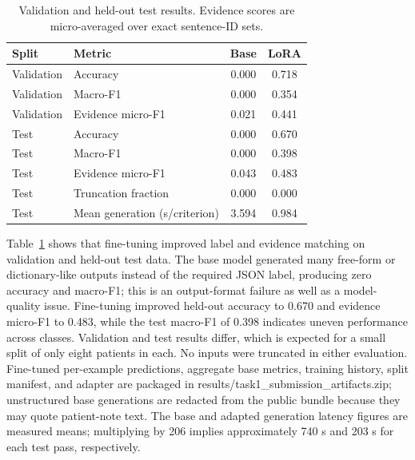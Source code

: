 \documentclass[conference]{IEEEtran}
\begin{document}
\begin{table}[t]\centering\caption{Validation and held-out test results. Evidence scores are micro-averaged over exact sentence-ID sets.}\label{tab:prediction}\begin{tabular}{llcc}\toprule Split & Metric & Base & LoRA\\\midrule Validation & Accuracy & 0.000 & 0.718\\Validation & Macro-F1 & 0.000 & 0.354\\Validation & Evidence micro-F1 & 0.021 & 0.441\\Test & Accuracy & 0.000 & 0.670\\Test & Macro-F1 & 0.000 & 0.398\\Test & Evidence micro-F1 & 0.043 & 0.483\\Test & Truncation fraction & 0.000 & 0.000\\Test & Mean generation (s/criterion) & 3.594 & 0.984\\\bottomrule\end{tabular}\end{table}
Table~\ref{tab:prediction} shows that fine-tuning improved label and evidence matching on validation and held-out test data. The base model generated many free-form or dictionary-like outputs instead of the required JSON label, producing zero accuracy and macro-F1; this is an output-format failure as well as a model-quality issue. Fine-tuning improved held-out accuracy to 0.670 and evidence micro-F1 to 0.483, while the test macro-F1 of 0.398 indicates uneven performance across classes. Validation and test results differ, which is expected for a small split of only eight patients in each. No inputs were truncated in either evaluation. Fine-tuned per-example predictions, aggregate base metrics, training history, split manifest, and adapter are packaged in results/task1_submission_artifacts.zip; unstructured base generations are redacted from the public bundle because they may quote patient-note text. The base and adapted generation latency figures are measured means; multiplying by 206 implies approximately 740 s and 203 s for each test pass, respectively.
\end{document}
